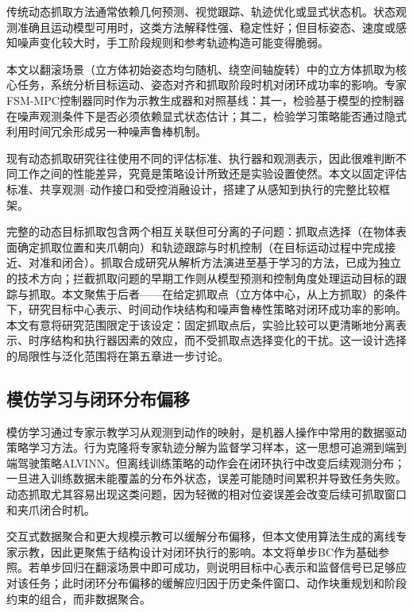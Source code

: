 传统动态抓取方法通常依赖几何预测、视觉跟踪、轨迹优化或显式状态机。状态观测准确且运动模型可用时，这类方法解释性强、稳定性好；但目标姿态、速度或感知噪声变化较大时，手工阶段规则和参考轨迹构造可能变得脆弱。

本文以翻滚场景（立方体初始姿态均匀随机、绕空间轴旋转）中的立方体抓取为核心任务，系统分析目标运动、姿态对齐和抓取阶段时机对闭环成功率的影响。专家FSM-MPC控制器同时作为示教生成器和对照基线：其一，检验基于模型的控制器在噪声观测条件下是否必须依赖显式状态估计；其二，检验学习策略能否通过隐式利用时间冗余形成另一种噪声鲁棒机制。

现有动态抓取研究往往使用不同的评估标准、执行器和观测表示，因此很难判断不同工作之间的性能差异，究竟是策略设计所致还是实验设置使然。本文以固定评估标准、共享观测--动作接口和受控消融设计，搭建了从感知到执行的完整比较框架。

完整的动态目标抓取包含两个相互关联但可分离的子问题：抓取点选择（在物体表面确定抓取位置和夹爪朝向）和轨迹跟踪与时机控制（在目标运动过程中完成接近、对准和闭合）。抓取合成研究从解析方法演进至基于学习的方法，已成为独立的技术方向\citep{bohg2014grasp,newbury2023deep,morrison2018ggcnn,mahler2017dexnet}；拦截抓取问题的早期工作则从模型预测和控制角度处理运动目标的跟踪与抓取\citep{allen1993automated}。本文聚焦于后者——在给定抓取点（立方体中心，从上方抓取）的条件下，研究目标中心表示、时间动作块结构和噪声鲁棒性策略对闭环成功率的影响。本文有意将研究范围限定于该设定：固定抓取点后，实验比较可以更清晰地分离表示、时序结构和执行器因素的效应，而不受抓取点选择变化的干扰。这一设计选择的局限性与泛化范围将在第五章进一步讨论。

\subsection{模仿学习与闭环分布偏移}

模仿学习通过专家示教学习从观测到动作的映射，是机器人操作中常用的数据驱动策略学习方法\citep{argall2009survey}。行为克隆将专家轨迹分解为监督学习样本，这一思想可追溯到端到端驾驶策略ALVINN\citep{pomerleau1989alvinn}。但离线训练策略的动作会在闭环执行中改变后续观测分布；一旦进入训练数据未能覆盖的分布外状态，误差可能随时间累积并导致任务失败\citep{ross2010efficient,ross2011reduction}。动态抓取尤其容易出现这类问题，因为轻微的相对位姿误差会改变后续可抓取窗口和夹爪闭合时机。

交互式数据聚合和更大规模示教可以缓解分布偏移\citep{ross2011reduction,mandlekar2021matters}，但本文使用算法生成的离线专家示教，因此更聚焦于结构设计对闭环执行的影响。本文将单步BC作为基础参照。若单步回归在翻滚场景中即可成功，则说明目标中心表示和监督信号已足够应对该任务；此时闭环分布偏移的缓解应归因于历史条件窗口、动作块重规划和阶段约束的组合，而非数据聚合。

